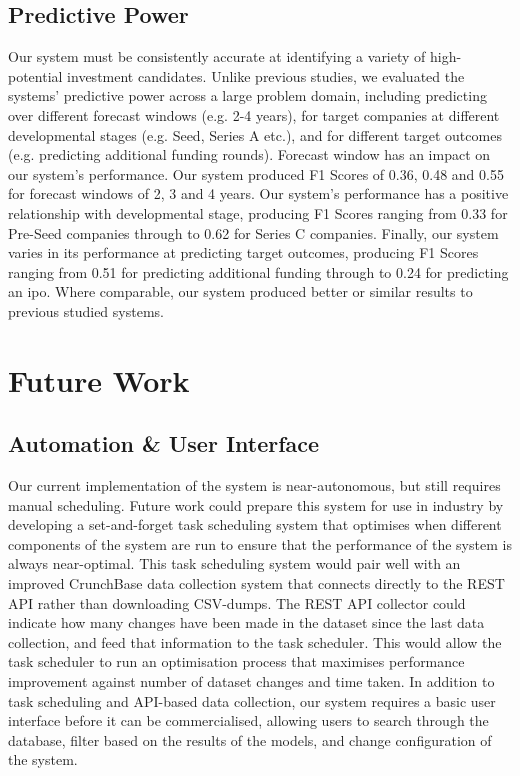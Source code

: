 \documentclass[../thesis/thesis.tex]{subfiles}
\begin{document}
\subsection{Predictive Power}

Our system must be consistently accurate at identifying a variety of high-potential investment candidates. Unlike previous studies, we evaluated the systems' predictive power across a large problem domain, including predicting over different forecast windows (e.g. 2-4 years), for target companies at different developmental stages (e.g. Seed, Series A etc.), and for different target outcomes (e.g. predicting additional funding rounds). Forecast window has an impact on our system's performance. Our system produced F1 Scores of 0.36, 0.48 and 0.55 for forecast windows of 2, 3 and 4 years. Our system's performance has a positive relationship with developmental stage, producing F1 Scores ranging from 0.33 for Pre-Seed companies through to 0.62 for Series C companies. Finally, our system varies in its performance at predicting target outcomes, producing F1 Scores ranging from 0.51 for predicting additional funding through to 0.24 for predicting an \gls{ipo}. Where comparable, our system produced better or similar results to previous studied systems.

\section{Future Work}

\subsection{Automation \& User Interface}

Our current implementation of the system is near-autonomous, but still requires manual scheduling. Future work could prepare this system for use in industry by developing a set-and-forget task scheduling system that optimises when different components of the system are run to ensure that the performance of the system is always near-optimal. This task scheduling system would pair well with an improved CrunchBase data collection system that connects directly to the REST API rather than downloading CSV-dumps. The REST API collector could indicate how many changes have been made in the dataset since the last data collection, and feed that information to the task scheduler. This would allow the task scheduler to run an optimisation process that maximises performance improvement against number of dataset changes and time taken. In addition to task scheduling and API-based data collection, our system requires a basic user interface before it can be commercialised, allowing users to search through the database, filter based on the results of the models, and change configuration of the system.
\end{document}
